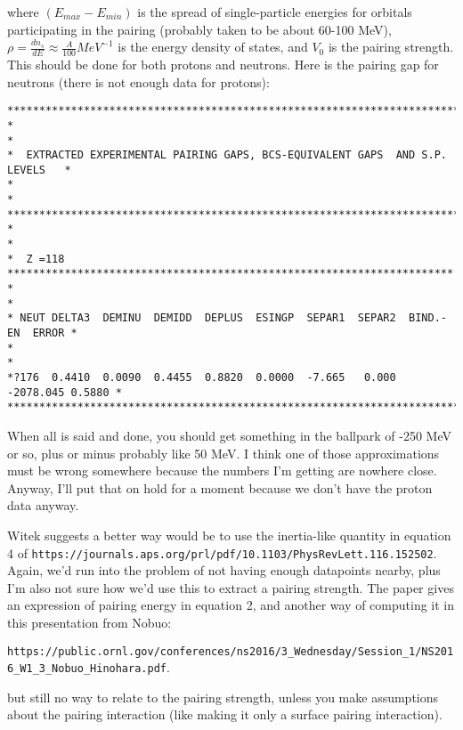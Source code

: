 \documentclass[]{report}
\begin{document}
\noindent where $(E_{max}-E_{min})$ is the spread of single-particle energies for orbitals participating in the pairing (probably taken to be about 60-100 MeV), $\rho = \frac{dn_s}{dE} \approx \frac{A}{100} MeV^{-1}$ is the energy density of states, and $V_0$ is the pairing strength. This should be done for both protons and neutrons. Here is the pairing gap for neutrons (there is not enough data for protons):

\begin{verbatim}
********************************************************************************
*                                                                              *
*  EXTRACTED EXPERIMENTAL PAIRING GAPS, BCS-EQUIVALENT GAPS  AND S.P. LEVELS   *
*                                                                              *
********************************************************************************
*                                                                              *
*  Z =118 **********************************************************************
*                                                                              *
* NEUT DELTA3  DEMINU  DEMIDD  DEPLUS  ESINGP  SEPAR1  SEPAR2  BIND.-EN  ERROR *
*                                                                              *
*?176  0.4410  0.0090  0.4455  0.8820  0.0000  -7.665   0.000 -2078.045 0.5880 *
********************************************************************************
\end{verbatim}

\noindent When all is said and done, you should get something in the ballpark of -250 MeV or so, plus or minus probably like 50 MeV. I think one of those approximations must be wrong somewhere because the numbers I'm getting are nowhere close. Anyway, I'll put that on hold for a moment because we don't have the proton data anyway.

Witek suggests a better way would be to use the inertia-like quantity in equation 4 of \verb|https://journals.aps.org/prl/pdf/10.1103/PhysRevLett.116.152502|. Again, we'd run into the problem of not having enough datapoints nearby, plus I'm also not sure how we'd use this to extract a pairing strength. The paper gives an expression of pairing energy in equation 2, and another way of computing it in this presentation from Nobuo:

\noindent\verb|https://public.ornl.gov/conferences/ns2016/3_Wednesday/Session_1/NS2016_W1_3_Nobuo_Hinohara.pdf|.

\noindent but still no way to relate to the pairing strength, unless you make assumptions about the pairing interaction (like making it only a surface pairing interaction).
\end{document}
